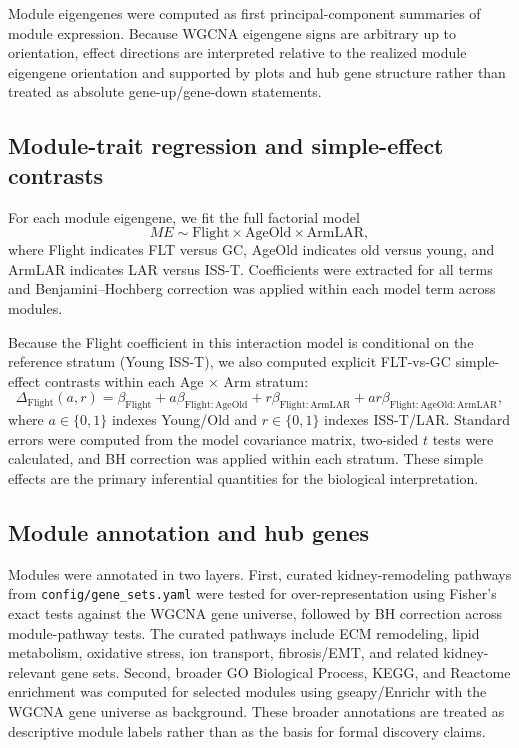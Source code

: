 \documentclass[11pt]{article}
\newcommand{\code}[1]{\texttt{#1}}
\newcommand{\pkg}[1]{\textsf{#1}}
\begin{document}
Module eigengenes were computed as first principal-component summaries of module expression. Because WGCNA eigengene signs are arbitrary up to orientation, effect directions are interpreted relative to the realized module eigengene orientation and supported by plots and hub gene structure rather than treated as absolute gene-up/gene-down statements.

\subsection{Module-trait regression and simple-effect contrasts}

For each module eigengene, we fit the full factorial model
\[
ME \sim \mathrm{Flight} \times \mathrm{AgeOld} \times \mathrm{ArmLAR},
\]
where Flight indicates FLT versus GC, AgeOld indicates old versus young, and ArmLAR indicates LAR versus ISS-T. Coefficients were extracted for all terms and Benjamini--Hochberg correction was applied within each model term across modules.

Because the Flight coefficient in this interaction model is conditional on the reference stratum (Young ISS-T), we also computed explicit FLT-vs-GC simple-effect contrasts within each Age $\times$ Arm stratum:
\[
\Delta_{\mathrm{Flight}}(a,r) =
\beta_{\mathrm{Flight}} + a\beta_{\mathrm{Flight:AgeOld}} +
r\beta_{\mathrm{Flight:ArmLAR}} +
ar\beta_{\mathrm{Flight:AgeOld:ArmLAR}},
\]
where $a\in\{0,1\}$ indexes Young/Old and $r\in\{0,1\}$ indexes ISS-T/LAR. Standard errors were computed from the model covariance matrix, two-sided $t$ tests were calculated, and BH correction was applied within each stratum. These simple effects are the primary inferential quantities for the biological interpretation.

\subsection{Module annotation and hub genes}

Modules were annotated in two layers. First, curated kidney-remodeling pathways from \code{config/gene\_sets.yaml} were tested for over-representation using Fisher's exact tests against the WGCNA gene universe, followed by BH correction across module-pathway tests. The curated pathways include ECM remodeling, lipid metabolism, oxidative stress, ion transport, fibrosis/EMT, and related kidney-relevant gene sets. Second, broader GO Biological Process, KEGG, and Reactome enrichment was computed for selected modules using \pkg{gseapy}/Enrichr with the WGCNA gene universe as background. These broader annotations are treated as descriptive module labels rather than as the basis for formal discovery claims.
\end{document}
